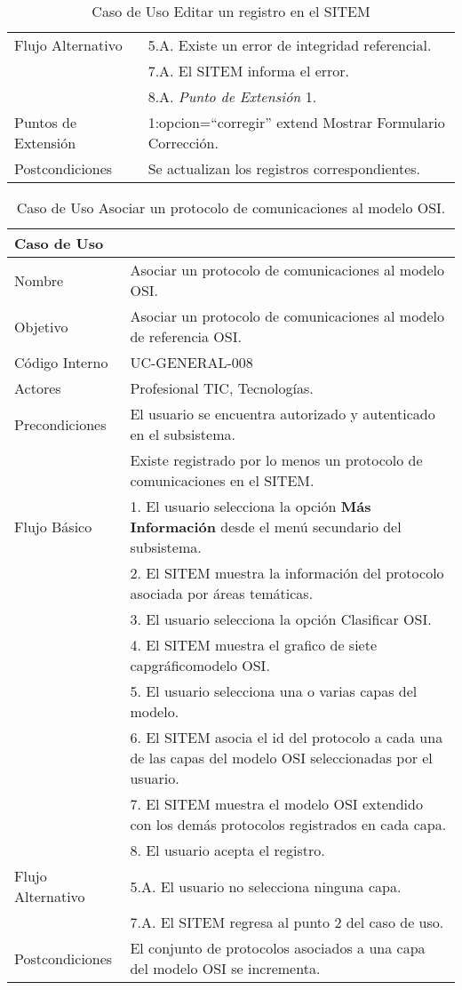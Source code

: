 \begin{table}
\begin{center}
\begin{tabular}{|l|p{10cm}|}
\hline
Flujo Alternativo & 5.A. Existe un error de integridad referencial. \\
& 7.A. El SITEM informa el error.\\
& 8.A. \textit{Punto de Extensión} 1.\\
\hline
Puntos de Extensión & 1:opcion=“corregir” extend Mostrar Formulario Corrección.\\
\hline
Postcondiciones & Se actualizan los registros correspondientes.\\
\hline
\end{tabular}
\caption{Caso de Uso Editar un registro en el SITEM}
\label{casouso7} 
\end{center}
\end{table}

\begin{table}
\begin{center}
\begin{tabular}{|l|p{10cm}|}
\hline
\textbf{Caso de Uso}&\\
\hline
Nombre & Asociar un protocolo de comunicaciones al modelo OSI.\\
\hline
Objetivo & Asociar un protocolo de comunicaciones al modelo de referencia OSI.\\
\hline
Código Interno & UC-GENERAL-008\\
\hline
Actores & Profesional TIC, Tecnologías.\\
\hline
Precondiciones & El usuario se encuentra autorizado y autenticado en el subsistema.\\
& Existe registrado por lo menos un protocolo de comunicaciones en el SITEM.\\
\hline
Flujo Básico & 1. El usuario selecciona la opción \textbf{Más Información} desde el menú secundario del subsistema.\\
& 2. El SITEM muestra la información del protocolo asociada por áreas temáticas.\\
& 3. El usuario selecciona la opción Clasificar OSI.\\
& 4. El SITEM muestra el grafico de siete capgráficomodelo OSI.\\
& 5. El usuario selecciona una o varias capas del modelo.\\
& 6. El SITEM asocia el id del protocolo a cada una de las capas del modelo OSI seleccionadas por el usuario.\\
& 7. El SITEM muestra el modelo OSI extendido con los demás protocolos registrados en cada capa.\\
& 8. El usuario acepta el registro.\\
\hline
Flujo Alternativo & 5.A. El usuario no selecciona ninguna capa. \\
& 7.A. El SITEM regresa al punto 2 del caso de uso.\\
\hline
Postcondiciones & El conjunto de protocolos asociados a una capa del modelo OSI se incrementa.\\
\hline
\end{tabular}
\caption{Caso de Uso Asociar un protocolo de comunicaciones al modelo OSI.}
\label{casouso8} 
\end{center}
\end{table}

